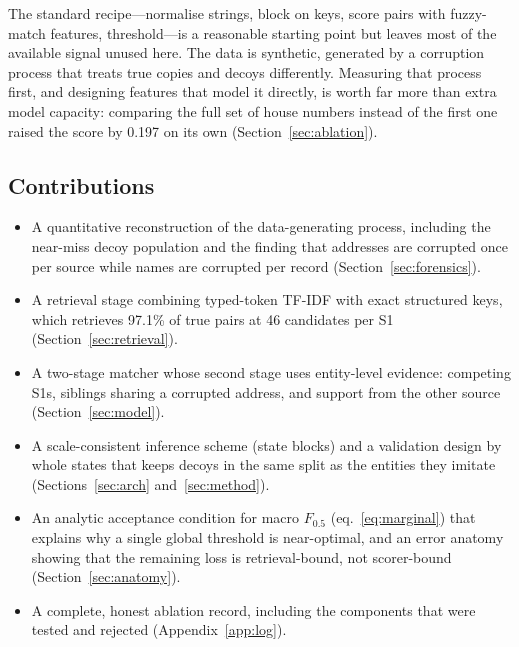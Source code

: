 \documentclass[10pt]{article}
\newcommand{\Fh}{F_{0.5}}
\begin{document}
The standard recipe---normalise strings, block on keys, score pairs with fuzzy-match features, threshold---is a reasonable starting point but leaves most of the available signal unused here. The data is synthetic, generated by a corruption process that treats true copies and decoys differently. Measuring that process first, and designing features that model it directly, is worth far more than extra model capacity: comparing the full set of house numbers instead of the first one raised the score by 0.197 on its own (Section~\ref{sec:ablation}).

\subsection{Contributions}
\begin{itemize}
\item A quantitative reconstruction of the data-generating process, including the near-miss decoy population and the finding that addresses are corrupted once per source while names are corrupted per record (Section~\ref{sec:forensics}).
\item A retrieval stage combining typed-token TF-IDF with exact structured keys, which retrieves 97.1\% of true pairs at 46 candidates per S1 (Section~\ref{sec:retrieval}).
\item A two-stage matcher whose second stage uses entity-level evidence: competing S1s, siblings sharing a corrupted address, and support from the other source (Section~\ref{sec:model}).
\item A scale-consistent inference scheme (state blocks) and a validation design by whole states that keeps decoys in the same split as the entities they imitate (Sections~\ref{sec:arch} and~\ref{sec:method}).
\item An analytic acceptance condition for macro $\Fh$ (eq.~\ref{eq:marginal}) that explains why a single global threshold is near-optimal, and an error anatomy showing that the remaining loss is retrieval-bound, not scorer-bound (Section~\ref{sec:anatomy}).
\item A complete, honest ablation record, including the components that were tested and rejected (Appendix~\ref{app:log}).
\end{itemize}
\end{document}
